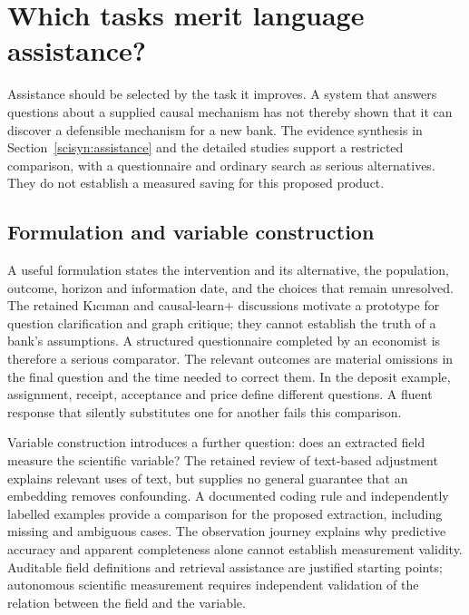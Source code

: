 \chapter{Which tasks merit language assistance?}
\label{rewrite:assistance-tasks}

Assistance should be selected by the task it improves. A system that answers
questions about a supplied causal mechanism has not thereby shown that
it can discover a defensible mechanism for a new bank. The evidence
synthesis in Section~\ref{scisyn:assistance} and the detailed studies
support a restricted comparison, with a questionnaire and ordinary search
as serious alternatives. They do not establish a measured saving for this
proposed product.



\section{Formulation and variable construction}
A useful formulation states the intervention and its alternative, the
population, outcome, horizon and information date, and the choices that remain
unresolved. The retained Kıcıman and causal-learn+ discussions motivate a
prototype for question clarification and graph critique; they cannot establish
the truth of a bank's assumptions. A structured questionnaire completed by an
economist is therefore a serious comparator. The relevant outcomes are material
omissions in the final question and the time needed to correct them. In the
deposit example, assignment, receipt, acceptance and price define different
questions. A fluent response that silently substitutes one for another fails
this comparison. \citep{v12_la_2305_00050,v12_la_2606_23608}

Variable construction introduces a further question: does an extracted field
measure the scientific variable? The retained review of text-based adjustment
explains relevant uses of text, but supplies no general guarantee that an
embedding removes confounding. A documented coding rule and independently
labelled examples provide a comparison for the proposed extraction, including
missing and ambiguous cases. The observation journey explains why predictive
accuracy and apparent completeness alone cannot establish measurement validity.
Auditable field definitions and retrieval assistance are justified starting
points; autonomous scientific measurement requires independent validation of
the relation between the field and the variable. \citep{exec13_census_text_review_arxiv}

